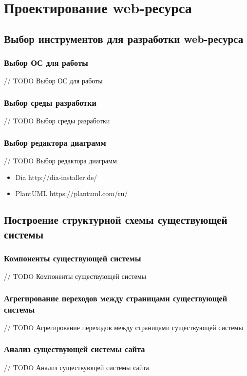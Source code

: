 \section{Проектирование web-ресурса}
    \subsection{Выбор инструментов для разработки web-ресурса}
        \subsubsection{Выбор ОС для работы}
        // TODO Выбор ОС для работы

        \subsubsection{Выбор среды разработки}
        // TODO Выбор среды разработки

        \subsubsection{Выбор редактора диаграмм}
        // TODO Выбор редактора диаграмм
            \begin{itemize}
                \item Dia   http://dia-installer.de/
                \item PlantUML  https://plantuml.com/ru/
            \end{itemize}
        
    \subsection{Построение структурной схемы существующей системы}
        \subsubsection{Компоненты существующей системы}
        // TODO Компоненты существующей системы

        \subsubsection{Агрегирование переходов между страницами существующей системы}
        // TODO Агрегирование переходов между страницами существующей системы

        \subsubsection{Анализ существующей системы сайта}
        // TODO Анализ существующей системы сайта

